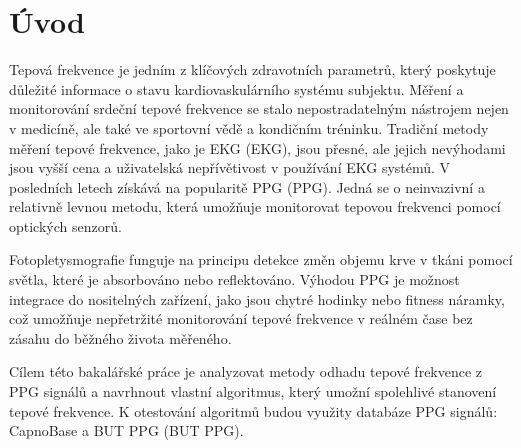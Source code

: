 \chapter*{Úvod}
{}

Tepová frekvence je jedním z klíčových zdravotních parametrů, který poskytuje důležité informace o
 stavu kardiovaskulárního systému subjektu.
Měření a monitorování srdeční tepové frekvence se stalo nepostradatelným nástrojem nejen v medicíně,
 ale také ve sportovní vědě a kondičním tréninku.
Tradiční metody měření tepové frekvence, jako je \acs{EKG} (\acl{EKG}), jsou přesné, ale jejich nevýhodami
 jsou vyšší cena a uživatelská nepřívětivost v používání \acs{EKG} systémů. 
V posledních letech získává na popularitě \acs{PPG} (\acl{PPG}).
Jedná se o neinvazivní a relativně levnou metodu, která umožňuje monitorovat tepovou frekvenci pomocí optických senzorů.

Fotopletysmografie funguje na principu detekce změn objemu krve v tkáni pomocí světla, které je absorbováno nebo reflektováno.
Výhodou \acs{PPG} je možnost integrace do nositelných zařízení, jako jsou chytré hodinky nebo fitness
 náramky, což umožňuje nepřetržité monitorování tepové frekvence v reálném čase bez zásahu do běžného života měřeného.

Cílem této bakalářské práce je analyzovat metody odhadu tepové frekvence z \acs{PPG} signálů a navrhnout vlastní algoritmus,
 který umožní spolehlivé stanovení tepové frekvence.
K otestování algoritmů budou využity databáze \acs{PPG} signálů: CapnoBase a \acs{BUT PPG} (\acl{BUT PPG}).


% 
% 
% 
